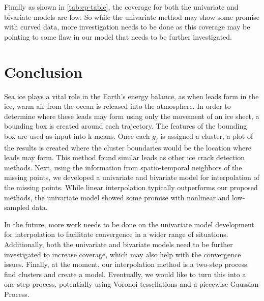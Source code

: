 \documentclass[12pt]{article}
\begin{document}
Finally as shown in \cref{tab:cp-table}, the coverage for both the
univariate and bivariate models are low. So while the univariate method
may show some promise with curved data, more investigation needs to be
done as this coverage may be pointing to some flaw in our model that
needs to be further investigated.

\hypertarget{conclusion}{%
\section{Conclusion}\label{conclusion}}

Sea ice plays a vital role in the Earth's energy balance, as when leads
form in the ice, warm air from the ocean is released into the
atmosphere. In order to determine where these leads may form using only
the movement of an ice sheet, a bounding box is created around each
trajectory. The features of the bounding box are used as input into
k-means. Once each \(g_j\) is assigned a cluster, a plot of the results
is created where the cluster boundaries would be the location where
leads may form. This method found similar leads as other ice crack
detection methods. Next, using the information from spatio-temporal
neighbors of the missing points, we developed a univariate and bivariate
model for interpolation of the missing points. While linear
interpolation typically outperforms our proposed methods, the univariate
model showed some promise with nonlinear and low-sampled data.

In the future, more work needs to be done on the univariate model
development for interpolation to facilitate convergence in a wider range
of situations. Additionally, both the univariate and bivariate models
need to be further investigated to increase coverage, which may also
help with the convergence issues. Finally, at the moment, our
interpolation method is a two-step process: find clusters and create a
model. Eventually, we would like to turn this into a one-step process,
potentially using Voronoi tessellations and a piecewise Gaussian
Process.



\end{document}
